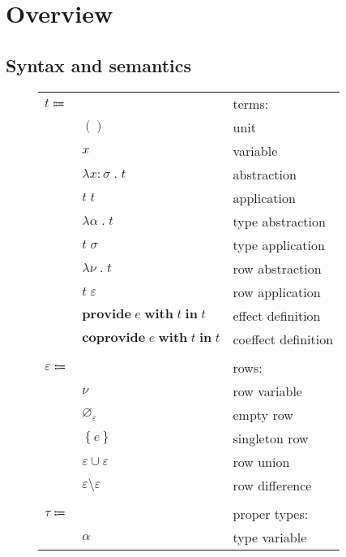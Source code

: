 \documentclass[12pt]{article}
\newcommand\anno[2]{#1 : #2}
\newcommand\term{t}
\newcommand\eunit{()}
\newcommand\evar{x}
\newcommand\eabs[2]{\lambda #1 \; . \; #2}
\newcommand\eapp[2]{#1 \; #2}
\newcommand\etabs[2]{\lambda #1 \; . \; #2}
\newcommand\etapp[2]{#1 \; #2}
\newcommand\eprovide[3]{\textbf{provide} \; #1 \; \textbf{with} \; #2 \; \textbf{in} \; #3}
\newcommand\ecoprovide[3]{\textbf{coprovide} \; #1 \; \textbf{with} \; #2 \; \textbf{in} \; #3}
\newcommand\proper{\tau}
\newcommand\embellished{\sigma}
\newcommand\tvar{\alpha}
\newcommand\row{\varepsilon}
\newcommand\rvar{\nu}
\newcommand\rempty{\varnothing_{\row}}
\newcommand\rsingleton[1]{\left\{ #1 \right\}}
\newcommand\runion[2]{#1 \cup #2}
\newcommand\rdiff[2]{#1 \setminus #2}
\newcommand\effect{e}
\begin{document}
  \section{Overview}

    \subsection{Syntax and semantics}

      \begin{figure}[H]
        \begin{mdframed}[backgroundcolor=none]
          \begin{center}
            \begin{tabular}{l l l}
              $\term \Coloneqq $ & & terms: \\
              & $\eunit$ & unit \\
              & $\evar$ & variable \\
              & $\eabs{\anno{\evar}{\embellished}}{\term}$ & abstraction \\
              & $\eapp{\term}{\term}$ & application \\
              & $\etabs{\tvar}{\term}$ & type abstraction \\
              & $\etapp{\term}{\embellished}$ & type application \\
              & $\etabs{\rvar}{\term}$ & row abstraction \\
              & $\etapp{\term}{\row}$ & row application \\
              & $\eprovide{\effect}{\term}{\term}$ & effect definition \\
              & $\ecoprovide{\effect}{\term}{\term}$ & coeffect definition \\
              \\
              $\row \Coloneqq$ & & rows: \\
              & $\rvar$ & row variable \\
              & $\rempty$ & empty row \\
              & $\rsingleton{\effect}$ & singleton row \\
              & $\runion{\row}{\row}$ & row union \\
              & $\rdiff{\row}{\row}$ & row difference \\
              \\
              $\proper \Coloneqq$ & & proper types: \\
              & $\tvar$ & type variable \\

\end{tabular}
\end{center}
\end{mdframed}
\end{figure}
\end{document}
